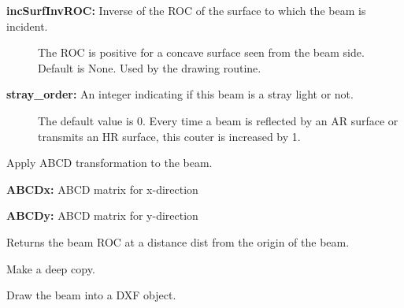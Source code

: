 \documentclass[letterpaper,10pt,english]{sphinxmanual}
\begin{document}
\begin{fulllineitems}
\begin{description}
\item[{\textbf{incSurfInvROC:} Inverse of the ROC of the surface to which the beam is incident.}] \leavevmode
The ROC is positive for a concave surface seen from
the beam side.
Default is None. Used by the drawing routine.

\item[{\textbf{stray\_order:} An integer indicating if this beam is a stray light or not.}] \leavevmode
The default value is 0. Every time a beam is reflected by an AR surface
or transmits an HR surface, this couter is increased by 1.

\end{description}

\begin{fulllineitems}
\label{api/gtrace:gtrace.beam.GaussianBeam.ABCDTrans}
Apply ABCD transformation to the beam.

\textbf{ABCDx:} ABCD matrix for x-direction

\textbf{ABCDy:} ABCD matrix for y-direction

\end{fulllineitems}


\begin{fulllineitems}
\label{api/gtrace:gtrace.beam.GaussianBeam.R}
Returns the beam ROC at a distance dist
from the origin of the beam.

\end{fulllineitems}


\begin{fulllineitems}
\label{api/gtrace:gtrace.beam.GaussianBeam.copy}
Make a deep copy.

\end{fulllineitems}


\begin{fulllineitems}
\label{api/gtrace:gtrace.beam.GaussianBeam.draw}
Draw the beam into a DXF object.


\end{fulllineitems}
\end{fulllineitems}
\end{document}
